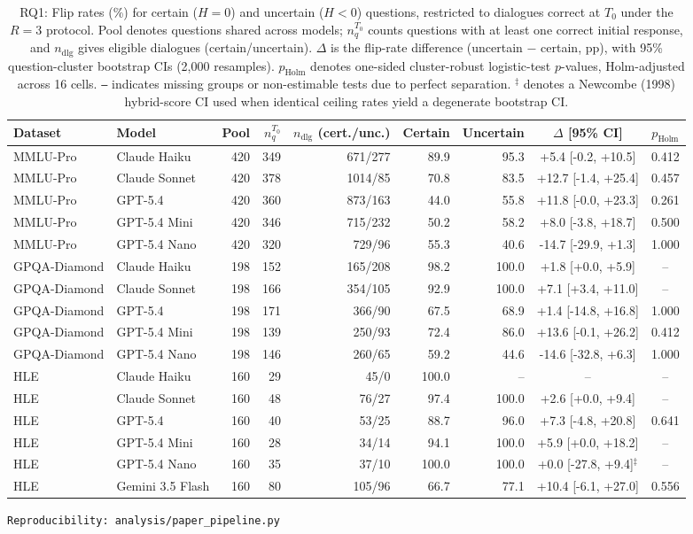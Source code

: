\begin{table}[t]
\centering
\caption{RQ1: Flip rates (\%) for certain ($H=0$) and uncertain ($H<0$) questions, restricted to dialogues correct at $T_0$ under the $R=3$ protocol. Pool denotes questions shared across models; $n_q^{T_0}$ counts questions with at least one correct initial response, and $n_{\text{dlg}}$ gives eligible dialogues (certain/uncertain). $\Delta$ is the flip-rate difference (uncertain $-$ certain, pp), with 95\% question-cluster bootstrap CIs (2,000 resamples). $p_{\text{Holm}}$ denotes one-sided cluster-robust logistic-test $p$-values, Holm-adjusted across 16 cells. \texttt{--} indicates missing groups or non-estimable tests due to perfect separation. $^\ddagger$ denotes a Newcombe (1998) hybrid-score CI used when identical ceiling rates yield a degenerate bootstrap CI.}
\label{tab:rq1}
\small
\begin{tabular}{llrrrrrcc}
\toprule
\textbf{Dataset} & \textbf{Model} & \textbf{Pool} & $n_q^{T_0}$ & $n_{\text{dlg}}$ (cert./unc.) & \textbf{Certain} & \textbf{Uncertain} & $\Delta$ [95\% CI] & $p_{\text{Holm}}$ \\
\midrule
MMLU-Pro & Claude Haiku & 420 & 349 & 671/277 & 89.9 & 95.3 & +5.4 [-0.2, +10.5] & 0.412 \\
MMLU-Pro & Claude Sonnet & 420 & 378 & 1014/85 & 70.8 & 83.5 & +12.7 [-1.4, +25.4] & 0.457 \\
MMLU-Pro & GPT-5.4 & 420 & 360 & 873/163 & 44.0 & 55.8 & +11.8 [-0.0, +23.3] & 0.261 \\
MMLU-Pro & GPT-5.4 Mini & 420 & 346 & 715/232 & 50.2 & 58.2 & +8.0 [-3.8, +18.7] & 0.500 \\
MMLU-Pro & GPT-5.4 Nano & 420 & 320 & 729/96 & 55.3 & 40.6 & -14.7 [-29.9, +1.3] & 1.000 \\
GPQA-Diamond & Claude Haiku & 198 & 152 & 165/208 & 98.2 & 100.0 & +1.8 [+0.0, +5.9] & -- \\
GPQA-Diamond & Claude Sonnet & 198 & 166 & 354/105 & 92.9 & 100.0 & +7.1 [+3.4, +11.0] & -- \\
GPQA-Diamond & GPT-5.4 & 198 & 171 & 366/90 & 67.5 & 68.9 & +1.4 [-14.8, +16.8] & 1.000 \\
GPQA-Diamond & GPT-5.4 Mini & 198 & 139 & 250/93 & 72.4 & 86.0 & +13.6 [-0.1, +26.2] & 0.412 \\
GPQA-Diamond & GPT-5.4 Nano & 198 & 146 & 260/65 & 59.2 & 44.6 & -14.6 [-32.8, +6.3] & 1.000 \\
HLE & Claude Haiku & 160 & 29 & 45/0 & 100.0 & -- & -- & -- \\
HLE & Claude Sonnet & 160 & 48 & 76/27 & 97.4 & 100.0 & +2.6 [+0.0, +9.4] & -- \\
HLE & GPT-5.4 & 160 & 40 & 53/25 & 88.7 & 96.0 & +7.3 [-4.8, +20.8] & 0.641 \\
HLE & GPT-5.4 Mini & 160 & 28 & 34/14 & 94.1 & 100.0 & +5.9 [+0.0, +18.2] & -- \\
HLE & GPT-5.4 Nano & 160 & 35 & 37/10 & 100.0 & 100.0 & +0.0 [-27.8, +9.4]$^\ddagger$ & -- \\
HLE & Gemini 3.5 Flash & 160 & 80 & 105/96 & 66.7 & 77.1 & +10.4 [-6.1, +27.0] & 0.556 \\
\bottomrule
\end{tabular}

\footnotesize \texttt{Reproducibility: analysis/paper\_pipeline.py}
\end{table}
